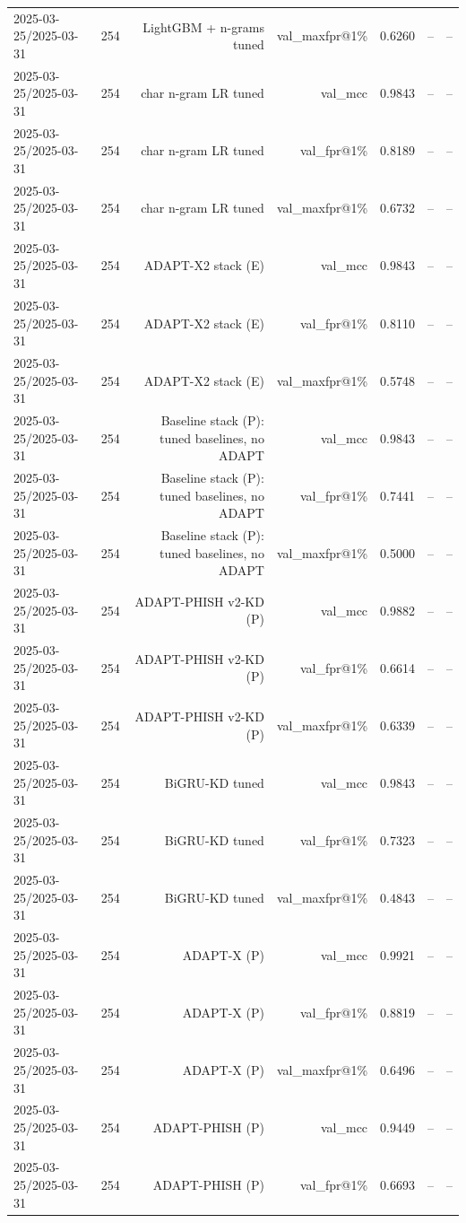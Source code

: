 \begin{table}[t]
\begin{tabular}{llrrrrr}
2025-03-25/2025-03-31 & 254 & LightGBM + n-grams tuned & val\_maxfpr@1\% & 0.6260 & -- & -- \\
2025-03-25/2025-03-31 & 254 & char n-gram LR tuned & val\_mcc & 0.9843 & -- & -- \\
2025-03-25/2025-03-31 & 254 & char n-gram LR tuned & val\_fpr@1\% & 0.8189 & -- & -- \\
2025-03-25/2025-03-31 & 254 & char n-gram LR tuned & val\_maxfpr@1\% & 0.6732 & -- & -- \\
2025-03-25/2025-03-31 & 254 & ADAPT-X2 stack (E) & val\_mcc & 0.9843 & -- & -- \\
2025-03-25/2025-03-31 & 254 & ADAPT-X2 stack (E) & val\_fpr@1\% & 0.8110 & -- & -- \\
2025-03-25/2025-03-31 & 254 & ADAPT-X2 stack (E) & val\_maxfpr@1\% & 0.5748 & -- & -- \\
2025-03-25/2025-03-31 & 254 & Baseline stack (P): tuned baselines, no ADAPT & val\_mcc & 0.9843 & -- & -- \\
2025-03-25/2025-03-31 & 254 & Baseline stack (P): tuned baselines, no ADAPT & val\_fpr@1\% & 0.7441 & -- & -- \\
2025-03-25/2025-03-31 & 254 & Baseline stack (P): tuned baselines, no ADAPT & val\_maxfpr@1\% & 0.5000 & -- & -- \\
2025-03-25/2025-03-31 & 254 & ADAPT-PHISH v2-KD (P) & val\_mcc & 0.9882 & -- & -- \\
2025-03-25/2025-03-31 & 254 & ADAPT-PHISH v2-KD (P) & val\_fpr@1\% & 0.6614 & -- & -- \\
2025-03-25/2025-03-31 & 254 & ADAPT-PHISH v2-KD (P) & val\_maxfpr@1\% & 0.6339 & -- & -- \\
2025-03-25/2025-03-31 & 254 & BiGRU-KD tuned & val\_mcc & 0.9843 & -- & -- \\
2025-03-25/2025-03-31 & 254 & BiGRU-KD tuned & val\_fpr@1\% & 0.7323 & -- & -- \\
2025-03-25/2025-03-31 & 254 & BiGRU-KD tuned & val\_maxfpr@1\% & 0.4843 & -- & -- \\
2025-03-25/2025-03-31 & 254 & ADAPT-X (P) & val\_mcc & 0.9921 & -- & -- \\
2025-03-25/2025-03-31 & 254 & ADAPT-X (P) & val\_fpr@1\% & 0.8819 & -- & -- \\
2025-03-25/2025-03-31 & 254 & ADAPT-X (P) & val\_maxfpr@1\% & 0.6496 & -- & -- \\
2025-03-25/2025-03-31 & 254 & ADAPT-PHISH (P) & val\_mcc & 0.9449 & -- & -- \\
2025-03-25/2025-03-31 & 254 & ADAPT-PHISH (P) & val\_fpr@1\% & 0.6693 & -- & -- \\

\end{tabular}
\end{table}
